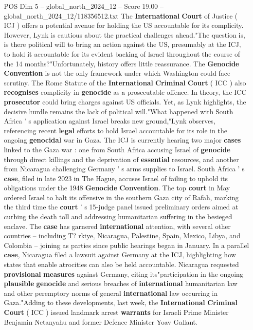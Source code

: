 \begin{textsample}{POS Dim 5 – global\_north\_2024\_12 – Score 19.00 – global\_north\_2024\_12/118356512.txt}
The \textbf{International} \textbf{Court} of Justice ( ICJ ) offers a potential avenue for holding the US accountable for its complicity.
However, Lynk is cautious about the practical challenges ahead."The question is, is there political will to bring an action against the US, presumably at the ICJ, to hold it accountable for its evident backing of Israel throughout the course of the 14 months?"Unfortunately, history offers little reassurance.
The \textbf{Genocide} \textbf{Convention} is not the only framework under which Washington could face scrutiny.
The Rome Statute of the \textbf{International} \textbf{Criminal} \textbf{Court} ( ICC ) also \textbf{recognises} complicity in \textbf{genocide} as a prosecutable offence.
In theory, the ICC \textbf{prosecutor} could bring charges against US officials.
Yet, as Lynk highlights, the decisive hurdle remains the lack of political will."What happened with South Africa ' s application against Israel breaks new ground,"Lynk observes, referencing recent \textbf{legal} efforts to hold Israel accountable for its role in the ongoing \textbf{genocidal} war in Gaza.
The ICJ is currently hearing two major \textbf{cases} linked to the Gaza war : one from South Africa accusing Israel of \textbf{genocide} through direct killings and the deprivation of \textbf{essential} resources, and another from Nicaragua challenging Germany ' s arms supplies to Israel.
South Africa ' s \textbf{case}, filed in late 2023 in The Hague, accuses Israel of failing to uphold its obligations under the 1948 \textbf{Genocide} \textbf{Convention}.
The top \textbf{court} in May ordered Israel to halt its offensive in the southern Gaza city of Rafah, marking the third time the \textbf{court} ' s 15-judge panel issued preliminary orders aimed at curbing the death toll and addressing humanitarian suffering in the besieged enclave.
The \textbf{case} has garnered \textbf{international} attention, with several other countries -- including T? rkiye, Nicaragua, Palestine, Spain, Mexico, Libya, and Colombia -- joining as parties since public hearings began in January.
In a parallel \textbf{case}, Nicaragua filed a lawsuit against Germany at the ICJ, highlighting how states that enable atrocities can also be held accountable.
Nicaragua requested \textbf{provisional} \textbf{measures} against Germany, citing its"participation in the ongoing \textbf{plausible} \textbf{genocide} and serious breaches of \textbf{international} humanitarian law and other peremptory norms of general \textbf{international} law occurring in Gaza."Adding to these developments, last week, the \textbf{International} \textbf{Criminal} \textbf{Court} ( ICC ) issued landmark arrest \textbf{warrants} for Israeli Prime Minister Benjamin Netanyahu and former Defence Minister Yoav Gallant.

\end{textsample}

